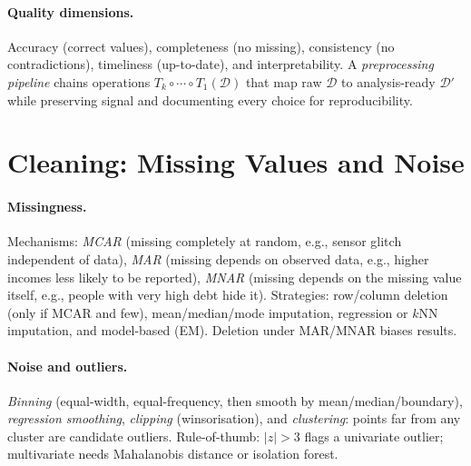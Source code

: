 \paragraph{Quality dimensions.} Accuracy (correct values), completeness (no missing), consistency (no contradictions), timeliness (up-to-date), and interpretability. A \emph{preprocessing pipeline} chains operations $T_k\circ\cdots\circ T_1(\mathcal{D})$ that map raw $\mathcal{D}$ to analysis-ready $\mathcal{D}'$ while preserving signal and documenting every choice for reproducibility.

\section{Cleaning: Missing Values and Noise}
\label{sec:cleaning}
\paragraph{Missingness.} Mechanisms: \emph{MCAR} (missing completely at random, e.g., sensor glitch independent of data), \emph{MAR} (missing depends on observed data, e.g., higher incomes less likely to be reported), \emph{MNAR} (missing depends on the missing value itself, e.g., people with very high debt hide it). Strategies: row/column deletion (only if MCAR and few), mean/median/mode imputation, regression or $k$NN imputation, and model-based (EM). Deletion under MAR/MNAR biases results.

\paragraph{Noise and outliers.} \emph{Binning} (equal-width, equal-frequency, then smooth by mean/median/boundary), \emph{regression smoothing}, \emph{clipping} (winsorisation), and \emph{clustering}: points far from any cluster are candidate outliers. Rule-of-thumb: $|z|>3$ flags a univariate outlier; multivariate needs Mahalanobis distance or isolation forest.

